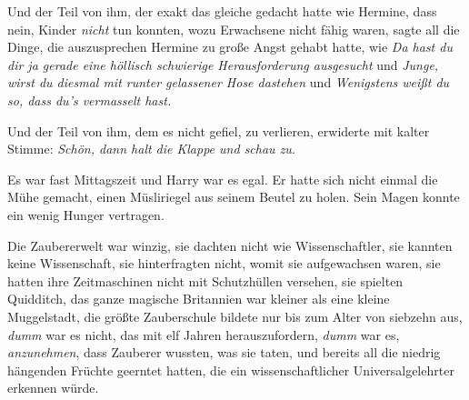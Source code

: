 Und der Teil von ihm, der exakt das gleiche gedacht hatte wie Hermine, dass nein, Kinder \emph{nicht} tun konnten, wozu Erwachsene nicht fähig waren, sagte all die Dinge, die auszusprechen Hermine zu große Angst gehabt hatte, wie \emph{Da hast du dir ja gerade eine höllisch schwierige Herausforderung ausgesucht} und \emph{Junge, wirst du diesmal mit runter gelassener Hose dastehen} und \emph{Wenigstens weißt du so, dass du’s vermasselt hast.}

Und der Teil von ihm, dem es nicht gefiel, zu verlieren, erwiderte mit kalter Stimme: \emph{Schön, dann halt die Klappe und schau zu.}

\later

Es war fast Mittagszeit und Harry war es egal. Er hatte sich nicht einmal die Mühe gemacht, einen Müsliriegel aus seinem Beutel zu holen. Sein Magen konnte ein wenig Hunger vertragen.

Die Zaubererwelt war winzig, sie dachten nicht wie Wissenschaftler, sie kannten keine Wissenschaft, sie hinterfragten nicht, womit sie aufgewachsen waren, sie hatten ihre Zeitmaschinen nicht mit Schutzhüllen versehen, sie spielten Quidditch, das ganze magische Britannien war kleiner als eine kleine Muggelstadt, die größte Zauberschule bildete nur bis zum Alter von siebzehn aus, \emph{dumm} war es nicht, das mit elf Jahren herauszufordern, \emph{dumm} war es, \emph{anzunehmen}, dass Zauberer wussten, was sie taten, und bereits all die niedrig hängenden Früchte geerntet hatten, die ein wissenschaftlicher Universalgelehrter erkennen würde.

